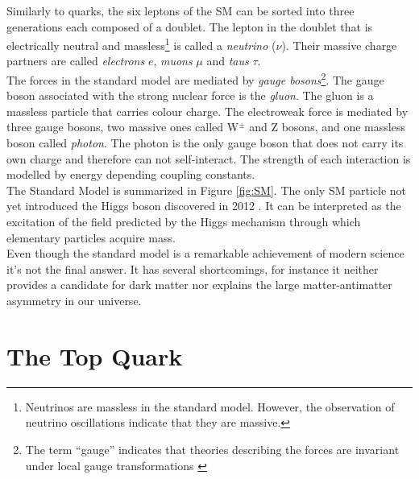 Similarly to quarks, the six leptons of the SM can be sorted into three generations each composed of a doublet. The lepton in the doublet that is electrically neutral and massless\footnote{Neutrinos are massless in the standard model. However, the observation of neutrino oscillations \cite{neutrinoOsci} indicate that they are massive.} is called a \textit{neutrino} ($\nu$). Their massive charge partners are called \textit{electrons} $e$, \textit{muons} $\mu$ and \textit{taus} $\tau$. \\
The forces in the standard model are mediated by \textit{gauge bosons}\footnote{The term ``gauge'' indicates that theories describing the forces are invariant under local gauge transformations \cite{GaugeInv}}. The gauge boson associated with the strong nuclear force is the \textit{gluon}. 
The gluon is a massless particle that carries colour charge. The electroweak force is mediated by three gauge bosons, two massive ones called W$^{\pm}$ and Z bosons, and one massless boson called \textit{photon}. The photon is the only gauge boson that does not carry its own charge and therefore can not self-interact. The strength of each interaction is modelled by energy depending coupling constants. \\
The Standard Model is summarized in Figure \ref{fig:SM}. The only SM particle not yet introduced the Higgs boson discovered in 2012 \cite{Higgs}. It can be interpreted as the excitation of the field predicted by the Higgs mechanism through which elementary particles acquire mass. \\
Even though the standard model is a remarkable achievement of modern science it's not the final answer. It has several shortcomings, for instance it neither provides a candidate for dark matter \cite{DM} nor explains the large matter-antimatter asymmetry in our universe\cite{MAM}.

\newpage  

\section{The Top Quark}
\label{sec:Top}

